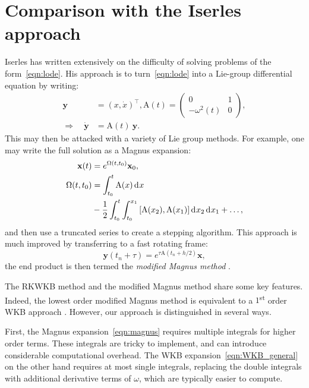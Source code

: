 \section{Comparison with the Iserles approach}
\label{sec:iserles_comparison}
Iserles has written extensively on the difficulty of solving problems of the form~\eqref{eqn:lode}. His approach is to turn~\eqref{eqn:lode} into a Lie-group differential equation \citep{Iserles00lie-groupmethods} by writing:
\begin{align}
  \mathbf{y} &= {(x,\dot{x})}^\top, 
  \mathrm{A}(t) = 
  \left(
  \begin{array}{cc}
    0 & 1 \\
    -\omega^2(t) & 0
  \end{array}
  \right),
  \\
  \Rightarrow\quad 
  \dot{\mathbf{y}} &= \mathrm{A} (t) \: \mathbf{y}.\label{eqn:lie_eqn}
\end{align}
This may then be attacked with a variety of Lie group methods. For example, one may write the full solution as a Magnus expansion:
\begin{align}
  \mathbf{x}(t) &= e^{\Omega(t,t_0)} \mathbf{x}_0,
  \label{eqn:magnus}\\
  \Omega(t,t_0) &= \int_{t_0}^t \mathrm{A}(x) \operatorname{d}^{}\!{x} \nonumber \\
  &- \frac{1}{2}\int_{t_0}^t\int_{t_0}^{x_1} \left[\mathrm{A}(x_2),\mathrm{A}(x_1)\right] \operatorname{d}^{}\!{x_2} \operatorname{d}^{}\!{x_1} + \ldots,
\end{align}
and then use a truncated series to create a stepping algorithm.
This approach is much improved by transferring to a fast rotating frame:
\begin{equation}
  \mathbf{y}(t_n+\tau) = e^{\tau \mathrm{A}(t_n+h/2)} \mathbf{x},
  \label{eqn:rotating_frame}
\end{equation}
the end product is then termed the {\em modified Magnus method\/} \citep{Iserles01thinkglobally}.

The RKWKB method and the modified Magnus method share some key features. Indeed, the lowest order modified Magnus method is equivalent to a \(1\)\textsuperscript{st} order WKB approach \citep{Iserles02globalerror}. However, our approach is distinguished in several ways. 

First, the Magnus expansion~\eqref{eqn:magnus} requires multiple integrals for higher order terms. These integrals are tricky to implement, and can introduce considerable computational overhead. The WKB expansion~\eqref{eqn:WKB_general} on the other hand requires at most single integrals, replacing the double integrals with additional derivative terms of \(\omega\), which are typically easier to compute.

